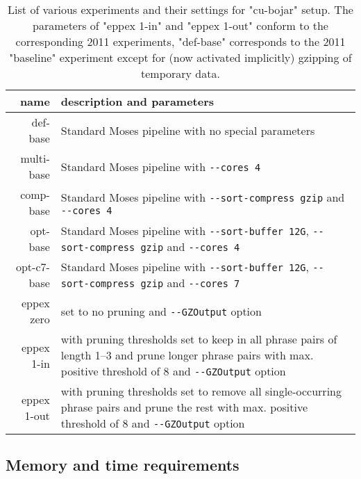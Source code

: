 \begin{table}[ht]
\centering
\begin{tabular}{ r p{10cm} }
name & description and parameters \\
\hline
\hline
def-base        & Standard Moses pipeline with no special parameters \\
multi-base      & Standard Moses pipeline with \verb|--cores 4| \\
comp-base       & Standard Moses pipeline with \verb|--sort-compress gzip|
  and \verb|--cores 4| \\
opt-base        & Standard Moses pipeline with \verb|--sort-buffer 12G|,
  \verb|--sort-compress gzip| and \verb|--cores 4| \\
opt-c7-base     & Standard Moses pipeline with \verb|--sort-buffer 12G|,
  \verb|--sort-compress gzip| and \verb|--cores 7| \\
eppex zero      & \eppex{} set to no pruning and \verb|--GZOutput| option \\
eppex 1-in      & \eppex{} with pruning thresholds set to keep in
  all phrase pairs of length 1--3 and prune longer phrase pairs
  with max. positive threshold of 8 and \verb|--GZOutput| option \\
eppex 1-out     & \eppex{} with pruning thresholds set to remove
  all single-occurring phrase pairs and prune the rest with
  max. positive threshold of 8 and \verb|--GZOutput| option \\
\hline
\hline
\end{tabular}
\caption{\label{cu-bojar-scenarios}List of various experiments and their
settings for "cu-bojar" setup. The parameters of "eppex 1-in" and "eppex 1-out"
conform to the corresponding 2011 experiments, "def-base" corresponds to the 2011
"baseline" experiment except for (now activated implicitly) gzipping of
temporary data.}
\end{table}

\subsection{Memory and time requirements}


